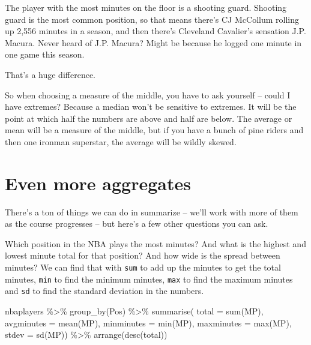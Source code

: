 \documentclass[
]{book}
\newenvironment{Shaded}{\begin{snugshade}}{\end{snugshade}}
\newcommand{\AttributeTok}[1]{\textcolor[rgb]{0.77,0.63,0.00}{#1}}
\newcommand{\FunctionTok}[1]{\textcolor[rgb]{0.00,0.00,0.00}{#1}}
\newcommand{\NormalTok}[1]{#1}
\newcommand{\SpecialCharTok}[1]{\textcolor[rgb]{0.00,0.00,0.00}{#1}}
\begin{document}
The player with the most minutes on the floor is a shooting guard. Shooting guard is the most common position, so that means there's CJ McCollum rolling up 2,556 minutes in a season, and then there's Cleveland Cavalier's sensation J.P. Macura. Never heard of J.P. Macura? Might be because he logged one minute in one game this season.

That's a huge difference.

So when choosing a measure of the middle, you have to ask yourself -- could I have extremes? Because a median won't be sensitive to extremes. It will be the point at which half the numbers are above and half are below. The average or mean will be a measure of the middle, but if you have a bunch of pine riders and then one ironman superstar, the average will be wildly skewed.

\hypertarget{even-more-aggregates}{%
\section{Even more aggregates}\label{even-more-aggregates}}

There's a ton of things we can do in summarize -- we'll work with more of them as the course progresses -- but here's a few other questions you can ask.

Which position in the NBA plays the most minutes? And what is the highest and lowest minute total for that position? And how wide is the spread between minutes? We can find that with \texttt{sum} to add up the minutes to get the total minutes, \texttt{min} to find the minimum minutes, \texttt{max} to find the maximum minutes and \texttt{sd} to find the standard deviation in the numbers.

\begin{Shaded}
\begin{Highlighting}[]
\NormalTok{nbaplayers }\SpecialCharTok{\%\textgreater{}\%} 
  \FunctionTok{group\_by}\NormalTok{(Pos) }\SpecialCharTok{\%\textgreater{}\%} 
  \FunctionTok{summarise}\NormalTok{(}
    \AttributeTok{total =} \FunctionTok{sum}\NormalTok{(MP), }
    \AttributeTok{avgminutes =} \FunctionTok{mean}\NormalTok{(MP), }
    \AttributeTok{minminutes =} \FunctionTok{min}\NormalTok{(MP),}
    \AttributeTok{maxminutes =} \FunctionTok{max}\NormalTok{(MP),}
    \AttributeTok{stdev =} \FunctionTok{sd}\NormalTok{(MP)) }\SpecialCharTok{\%\textgreater{}\%} \FunctionTok{arrange}\NormalTok{(}\FunctionTok{desc}\NormalTok{(total))}
\end{Highlighting}
\end{Shaded}
\end{document}
